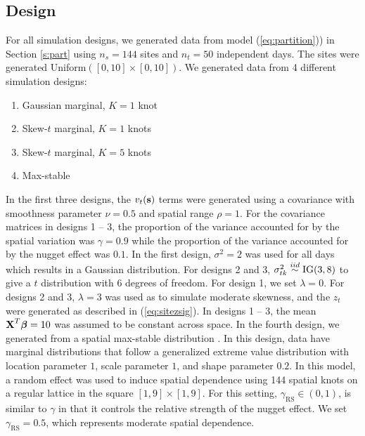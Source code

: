 \documentclass[11pt]{article}
\begin{document}
\subsection{Design}\label{s:simdesign}
For all simulation designs, we generated data from model (\ref{eq:partition})) in Section \ref{s:part} using $n_s=144$ sites and $n_t=50$ independent days.
The sites were generated Uniform$([0, 10] \times [0, 10])$.
We generated data from 4 different simulation designs:
\begin{enumerate} \setlength{\itemsep}{-0.5em}
  \item Gaussian marginal, $K=1$ knot
  \item Skew-$t$ marginal, $K=1$ knots
  \item Skew-$t$ marginal, $K=5$ knots
  \item Max-stable
\end{enumerate}
In the first three designs, the $v_t(\mbox{\bf s})$ terms were generated using a \Matern covariance with smoothness parameter $\nu = 0.5$ and spatial range $\rho = 1$.
For the covariance matrices in designs 1 -- 3, the proportion of the variance accounted for by the spatial variation was $\gamma = 0.9$ while the proportion of the variance accounted for by the nugget effect was $0.1$.
In the first design, $\sigma^2 = 2$ was used for all days which results in a Gaussian distribution.
For designs 2 and 3, $\sigma^2_{tk} \stackrel{iid}{\sim} \text{IG}(3, 8)$ to give a $t$ distribution with 6 degrees of freedom.
For design 1, we set $\lambda = 0$.
For designs 2 and 3, $\lambda = 3$ was used as to simulate moderate skewness, and the $z_t$ were generated as described in (\ref{eq:sitezsig}).
In designs 1 -- 3, the mean $\mbox{\bf X}^T \mbox{\boldmath $\beta$} = 10$ was assumed to be constant across space.
In the fourth design, we generated from a spatial max-stable distribution \citep{Reich2012}.
In this design, data have marginal distributions that follow a generalized extreme value distribution with location parameter $1$, scale parameter $1$, and shape parameter $0.2$.
In this model, a random effect was used to induce spatial dependence using 144 spatial knots on a regular lattice in the square $[1, 9] \times [1, 9]$.
For this setting, $\gamma_{\text{RS}} \in (0, 1)$, is similar to $\gamma$ in that it controls the relative strength of the nugget effect.
We set $\gamma_{\text{RS}} = 0.5$, which represents moderate spatial dependence.
\end{document}
